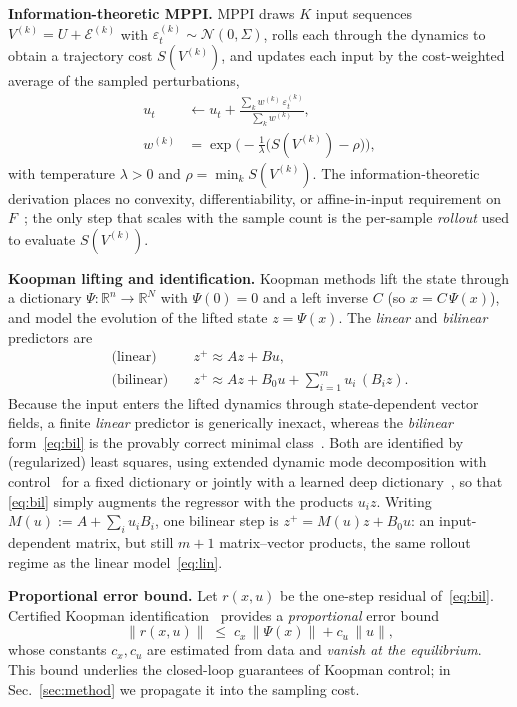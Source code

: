 \documentclass[lettersize,journal]{IEEEtran}
\theoremstyle{remark}
\begin{document}
\textbf{Information-theoretic MPPI.}
MPPI draws $K$ input sequences $V^{(k)}=U+\mathcal{E}^{(k)}$ with $\varepsilon_t^{(k)}\sim\mathcal N(0,\Sigma)$, rolls each through the dynamics to obtain a trajectory cost $S(V^{(k)})$, and updates each input by the cost-weighted average of the sampled perturbations,
\begin{equation}\label{eq:mppi}
\begin{aligned}
u_t &\leftarrow u_t + \frac{\sum_{k} w^{(k)}\,\varepsilon_t^{(k)}}{\sum_k w^{(k)}},\\[2pt]
w^{(k)} &= \exp\!\Big(-\tfrac1\lambda\big(S(V^{(k)})-\rho\big)\Big),
\end{aligned}
\end{equation}
with temperature $\lambda>0$ and $\rho=\min_k S(V^{(k)})$.
The information-theoretic derivation places no convexity, differentiability, or affine-in-input requirement on $F$~\cite{williams2018mppi}; the only step that scales with the sample count is the per-sample \emph{rollout} used to evaluate $S(V^{(k)})$.

\textbf{Koopman lifting and identification.}
Koopman methods lift the state through a dictionary $\Psi:\mathbb R^n\to\mathbb R^N$ with $\Psi(0)=0$ and a left inverse $C$ (so $x=C\,\Psi(x)$), and model the evolution of the lifted state $z=\Psi(x)$.
The \emph{linear} and \emph{bilinear} predictors are
\begin{align}
\text{(linear)}\quad & z^+ \approx A z + B u, \label{eq:lin}\\
\text{(bilinear)}\quad & z^+ \approx A z + B_0 u + \textstyle\sum_{i=1}^m u_i\,(B_i z). \label{eq:bil}
\end{align}
Because the input enters the lifted dynamics through state-dependent vector fields, a finite \emph{linear} predictor is generically inexact, whereas the \emph{bilinear} form~\eqref{eq:bil} is the provably correct minimal class~\cite{iacob2024}.
Both are identified by (regularized) least squares, using extended dynamic mode decomposition with control~\cite{williams2015edmd,proctor2016dmdc} for a fixed dictionary or jointly with a learned deep dictionary~\cite{lusch2018deep}, so that \eqref{eq:bil} simply augments the regressor with the products $u_i z$.
Writing $M(u):=A+\sum_i u_i B_i$, one bilinear step is $z^+=M(u)z+B_0u$: an input-dependent matrix, but still $m{+}1$ matrix--vector products, the same rollout regime as the linear model~\eqref{eq:lin}.

\textbf{Proportional error bound.}
Let $r(x,u)$ be the one-step residual of~\eqref{eq:bil}.
Certified Koopman identification~\cite{strasser2026,safedmd2024} provides a \emph{proportional} error bound
\begin{equation}\label{eq:propbound}
\|r(x,u)\| \;\le\; c_x\,\|\Psi(x)\| + c_u\,\|u\|,
\end{equation}
whose constants $c_x,c_u$ are estimated from data and \emph{vanish at the equilibrium}.
This bound underlies the closed-loop guarantees of Koopman control; in Sec.~\ref{sec:method} we propagate it into the sampling cost.
\end{document}
